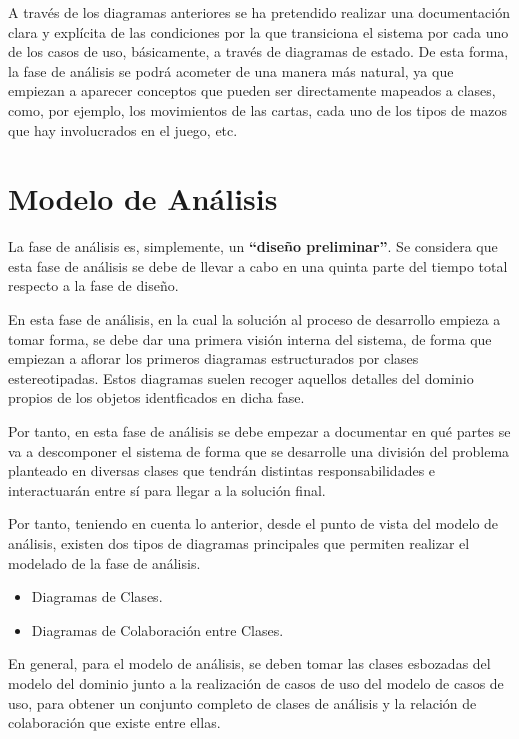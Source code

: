 \documentclass[11pt]{article}
\begin{document}
A través de los diagramas anteriores se ha pretendido realizar una documentación clara y explícita de las condiciones por la que transiciona el sistema por cada uno de los casos de uso, básicamente, a través de diagramas de estado. De esta forma, la fase de análisis se podrá acometer de una manera más natural, ya que empiezan a aparecer conceptos que pueden ser directamente mapeados a clases, como, por ejemplo, los movimientos de las cartas, cada uno de los tipos de mazos que hay involucrados en el juego, etc.

\pagebreak

\section{Modelo de Análisis}

La fase de análisis es, simplemente, un \textbf{``diseño preliminar''}. Se considera que esta fase de análisis se debe de llevar a cabo en una quinta parte del tiempo total respecto a la fase de diseño.

En esta fase de análisis, en la cual la solución al proceso de desarrollo empieza a tomar forma, se debe dar una primera visión interna del sistema, de forma que empiezan a aflorar los primeros diagramas estructurados por clases estereotipadas. Estos diagramas suelen recoger aquellos detalles del dominio propios de los objetos identficados en dicha fase.

Por tanto, en esta fase de análisis se debe empezar a documentar en qué partes se va a descomponer el sistema de forma que se desarrolle una división del problema planteado en diversas clases que tendrán distintas responsabilidades e interactuarán entre sí para llegar a la solución final. 

Por tanto, teniendo en cuenta lo anterior, desde el punto de vista del modelo de análisis, existen dos tipos de diagramas principales que permiten realizar el modelado de la fase de análisis.

\begin{itemize}
\item{Diagramas de Clases}. 
\item{Diagramas de Colaboración entre Clases}.
\end{itemize}

En general, para el modelo de análisis, se deben tomar las clases esbozadas del modelo del dominio junto a la realización de casos de uso del modelo de casos de uso, para obtener un conjunto completo de clases de análisis y la relación de colaboración que existe entre ellas.
\end{document}
